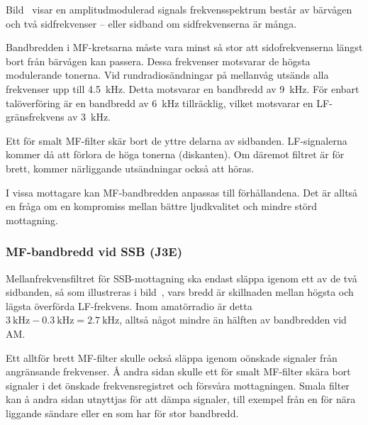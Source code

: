 
Bild~ visar en amplitudmodulerad signals frekvensspektrum
består av bärvågen och två sidfrekvenser -- eller sidband om sidfrekvenserna
är många.

Bandbredden i MF-kretsarna måste vara minst så stor att sidofrekvenserna
längst bort från bärvågen kan passera.
Dessa frekvenser motsvarar de högsta modulerande tonerna.
Vid rundradiosändningar på mellanvåg utsänds alla frekvenser upp till
\qty{4,5}{\kilo\hertz}.
Detta motsvarar en bandbredd av \qty{9}{\kilo\hertz}.
För enbart talöverföring är en bandbredd av \qty{6}{\kilo\hertz} tillräcklig,
vilket motsvarar en LF-gränsfrekvens av \qty{3}{\kilo\hertz}.

Ett för smalt MF-filter skär bort de yttre delarna av sidbanden.
LF-signalerna kommer då att förlora de höga tonerna (diskanten).
Om däremot filtret är för brett, kommer närliggande utsändningar också att
höras.

I vissa mottagare kan MF-bandbredden anpassas till förhållandena.
Det är alltså en fråga om en kompromiss mellan bättre ljudkvalitet och
mindre störd mottagning.

\subsubsection{MF-bandbredd vid SSB (J3E)}


Mellanfrekvensfiltret för SSB-mottagning ska endast släppa igenom
ett av de två sidbanden, så som illustreras i bild~,
vars bredd är skillnaden mellan högsta och lägsta överförda LF-frekvens.
Inom amatörradio är detta \(\qty{3}{\kilo\hertz} - \qty{0,3}{\kilo\hertz} =
\qty{2,7}{\kilo\hertz}\), alltså något mindre än hälften av bandbredden vid AM.

Ett alltför brett MF-filter skulle också släppa igenom oönskade
signaler från angränsande frekvenser.
Å andra sidan skulle ett för smalt MF-filter skära bort signaler i det
önskade frekvensregistret och försvåra mottagningen.
Smala filter kan å andra sidan utnyttjas för att dämpa signaler, till exempel
från en för nära liggande sändare eller en som har för stor bandbredd.

